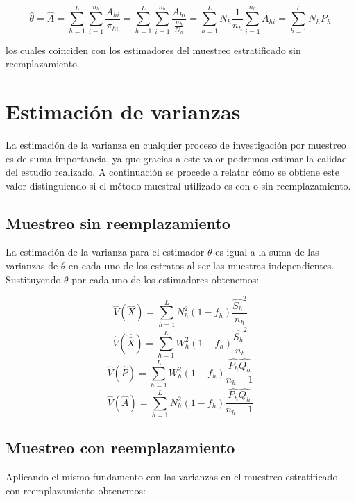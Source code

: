 \begin{equation}
    \hat{\theta} = \hat{A} = \sum_{h=1}^{L}\sum_{i=1}^{n_h}\frac{A_{hi}}{\pi_{hi}} = \sum_{h=1}^{L}\sum_{i=1}^{n_h}\frac{A_{hi}}{\frac{n_h}{N_h}} = \sum_{h=1}^{L}N_h\frac{1}{n_h}\sum_{i=1}^{n_h}A_{hi} = \sum_{h=1}^{L}N_hP_h
\end{equation}

los cuales coinciden con los estimadores del muestreo estratificado sin reemplazamiento.\\

\section{Estimación de varianzas} \label{sect:4.3}

La estimación de la varianza en cualquier proceso de investigación por muestreo es de suma importancia, ya que gracias a este valor podremos estimar la calidad del estudio realizado. A continuación se procede a relatar cómo se obtiene este valor distinguiendo si el método muestral utilizado es con o sin reemplazamiento.\\

\subsection{Muestreo sin reemplazamiento}
La estimación de la varianza para el estimador $\theta$ es igual a la suma de las varianzas de $\theta$ en cada uno de los estratos al ser las muestras independientes. Sustituyendo $\theta$ por cada uno de los estimadores obtenemos:

\begin{equation}
    \hat{V}(\hat{X}) = \sum_{h=1}^{L}N_h^2(1-f_h)\frac{\hat{S_h}^2}{n_h}
\end{equation}
\begin{equation}
    \hat{V}(\hat{\bar{X}}) = \sum_{h=1}^{L}W_h^2(1-f_h)\frac{\hat{S_h}^2}{n_h}
\end{equation}    
\begin{equation}
    \hat{V}(\hat{P}) = \sum_{h=1}^{L}W_h^2(1-f_h)\frac{\hat{P_h}\hat{Q_h}}{n_h-1}
\end{equation}
\begin{equation}
    \hat{V}(\hat{A}) = \sum_{h=1}^{L}N_h^2(1-f_h)\frac{\hat{P_h}\hat{Q_h}}{n_h-1}
\end{equation}

\subsection{Muestreo con reemplazamiento}
Aplicando el mismo fundamento con las varianzas en el muestreo estratificado con reemplazamiento obtenemos:

